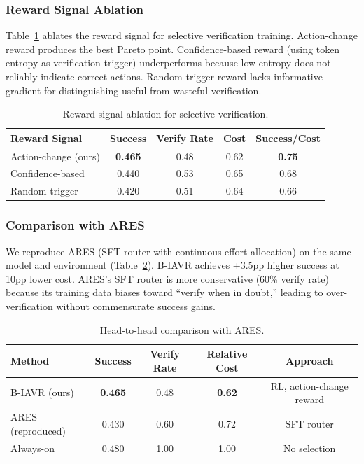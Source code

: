 \documentclass[11pt]{article}
\begin{document}
\subsubsection{Reward Signal Ablation}

Table~\ref{tab:reward_ablation} ablates the reward signal for selective verification training. Action-change reward produces the best Pareto point. Confidence-based reward (using token entropy as verification trigger) underperforms because low entropy does not reliably indicate correct actions. Random-trigger reward lacks informative gradient for distinguishing useful from wasteful verification.

\begin{table}[h]
\centering
\caption{Reward signal ablation for selective verification.}
\label{tab:reward_ablation}
\begin{tabular}{lcccc}
\toprule
Reward Signal & Success & Verify Rate & Cost & Success/Cost \\
\midrule
Action-change (ours) & \textbf{0.465} & 0.48 & 0.62 & \textbf{0.75} \\
Confidence-based & 0.440 & 0.53 & 0.65 & 0.68 \\
Random trigger & 0.420 & 0.51 & 0.64 & 0.66 \\
\bottomrule
\end{tabular}
\end{table}

\subsubsection{Comparison with ARES}

We reproduce ARES (SFT router with continuous effort allocation) on the same model and environment (Table~\ref{tab:ares}). B-IAVR achieves +3.5pp higher success at 10pp lower cost. ARES's SFT router is more conservative (60\% verify rate) because its training data biases toward ``verify when in doubt,'' leading to over-verification without commensurate success gains.

\begin{table}[h]
\centering
\caption{Head-to-head comparison with ARES.}
\label{tab:ares}
\begin{tabular}{lcccc}
\toprule
Method & Success & Verify Rate & Relative Cost & Approach \\
\midrule
B-IAVR (ours) & \textbf{0.465} & 0.48 & \textbf{0.62} & RL, action-change reward \\
ARES (reproduced) & 0.430 & 0.60 & 0.72 & SFT router \\
Always-on & 0.480 & 1.00 & 1.00 & No selection \\
\bottomrule
\end{tabular}
\end{table}
\end{document}
